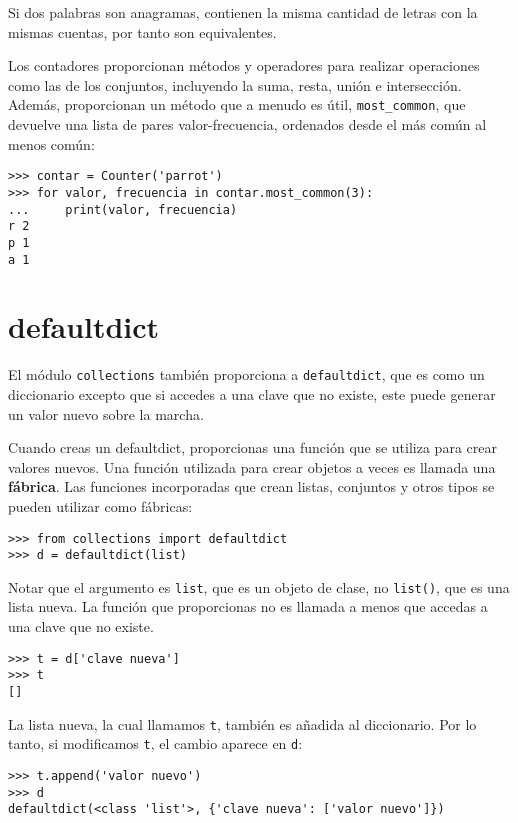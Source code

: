 \documentclass[10pt]{book}
\begin{document}
Si dos palabras son anagramas, contienen la misma cantidad de letras con la mismas
cuentas, por tanto son equivalentes.

Los contadores proporcionan métodos y operadores para realizar operaciones como las de los conjuntos,
incluyendo la suma, resta, unión e intersección.  Además,
proporcionan un método que a menudo es útil, \verb"most_common", que
devuelve una lista de pares valor-frecuencia, ordenados desde el más común al
menos común:

\begin{verbatim}
>>> contar = Counter('parrot')
>>> for valor, frecuencia in contar.most_common(3):
...     print(valor, frecuencia)
r 2
p 1
a 1
\end{verbatim}


\section{defaultdict}

El módulo {\tt collections} también proporciona a {\tt defaultdict}, que es
como un diccionario excepto que si accedes a una clave que no existe,
este puede generar un valor nuevo sobre la marcha.

Cuando creas un defaultdict, proporcionas una función que se utiliza para
crear valores nuevos.  Una función utilizada para crear objetos a veces es
llamada una {\bf fábrica}.  Las funciones incorporadas que crean listas, conjuntos
y otros tipos se pueden utilizar como fábricas:

\begin{verbatim}
>>> from collections import defaultdict
>>> d = defaultdict(list)
\end{verbatim}

Notar que el argumento es {\tt list}, que es un objeto de clase,
no {\tt list()}, que es una lista nueva.  La función que proporcionas
no es llamada a menos que accedas a una clave que no existe.

\begin{verbatim}
>>> t = d['clave nueva']
>>> t
[]
\end{verbatim}

La lista nueva, la cual llamamos {\tt t}, también es añadida al
diccionario.  Por lo tanto, si modificamos {\tt t}, el cambio aparece en {\tt d}:

\begin{verbatim}
>>> t.append('valor nuevo')
>>> d
defaultdict(<class 'list'>, {'clave nueva': ['valor nuevo']})
\end{verbatim}
\end{document}
